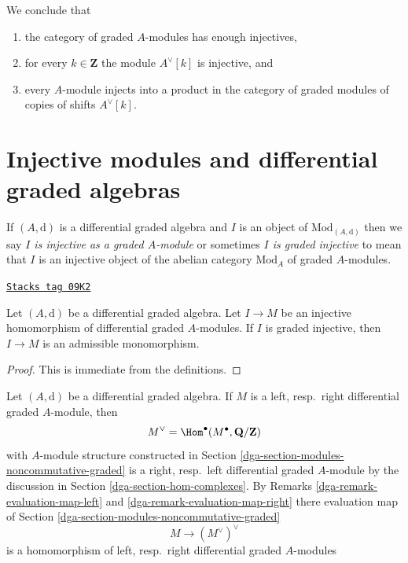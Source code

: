 \medskip\noindent
We conclude that
\begin{enumerate}
\item the category of graded $A$-modules has enough injectives,
\item for every $k \in \mathbf{Z}$ the module $A^\vee[k]$ is injective, and
\item every $A$-module injects into a product in the category of graded
modules of copies of shifts $A^\vee[k]$.
\end{enumerate}

\section{Injective modules and differential graded algebras}
\label{dga-section-modules-noncommutative-differential-graded}
If $(A, \text{d})$ is a differential graded algebra and $I$ is
an object of $\text{Mod}_{(A, \text{d})}$ then we say
{\it $I$ is injective as a graded $A$-module} or sometimes
{\it $I$ is graded injective} to mean
that $I$ is an injective object of the abelian category $\text{Mod}_A$
of graded $A$-modules.

\begin{lemma}
\label{dga-lemma-source-graded-injective}
\href{https://stacks.math.columbia.edu/tag/09K2}{\texttt{Stacks tag 09K2}}

Let $(A, \text{d})$ be a differential graded algebra.
Let $I \to M$ be an injective homomorphism of differential graded
$A$-modules. If $I$ is graded injective, then
$I \to M$ is an admissible monomorphism.
\end{lemma}

\begin{proof}
This is immediate from the definitions.
\end{proof}

Let $(A, \text{d})$ be a differential graded algebra. If $M$ is a
left, resp.\ right differential graded $A$-module, then
$$
M^\vee = \Hom^\bullet(M^\bullet, \mathbf{Q}/\mathbf{Z})
$$
with $A$-module structure constructed in
Section \ref{dga-section-modules-noncommutative-graded} is a
right, resp.\ left differential graded $A$-module by the
discussion in Section \ref{dga-section-hom-complexes}.
By Remarks
\ref{dga-remark-evaluation-map-left} and \ref{dga-remark-evaluation-map-right}
there evaluation map of Section \ref{dga-section-modules-noncommutative-graded}
$$
M \longrightarrow (M^\vee)^\vee
$$
is a homomorphism of left, resp.\ right differential graded $A$-modules

